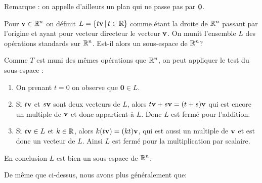 
Remarque : on appelle d'ailleurs  un plan qui ne passe pas par $\mathbf{0}$.


\begin{myprob}
Pour $\mathbf{v} \in \mathbb{R}^n$ on définit $L = \{ t\mathbf{v} \,|\, t\in \mathbb{R}\}$ comme
étant la droite de $\mathbb{R}^n$ passant par l'origine et ayant pour vecteur
directeur le vecteur $\mathbf{v}$. On munit l'ensemble $L$ des opérations standards sur $\mathbb{R}^n$. Est-il alors un sous-espace de $\mathbb{R}^n$?

\begin{mysol}
Comme $T$ est muni des mêmes opérations que $\mathbb{R}^n$, on peut appliquer le test du sous-espace :

\begin{enumerate}
\item
    On prenant $t=0$ on observe que $\mathbf 0 \in L$.
\item
  Si $t\mathbf{v}$ et $s\mathbf{v}$ sont deux vecteurs de $L$, alors
  $t\mathbf{v} + s\mathbf{v} = (t+s)\mathbf{v}$ qui est encore un multiple de
  $\mathbf{v}$ et donc appartient \`a $L$. Donc $L$ est fermé pour l'addition.
\item
  Si $t\mathbf{v} \in L$ et $k\in\mathbb{R}$, alors $k(t\mathbf{v}) = (kt)\mathbf{v}$, qui est aussi
  un multiple de $\mathbf{v}$ et est donc un vecteur de $L$. Ainsi $L$ est
  fermé pour la multiplication par scalaire.
\end{enumerate}

En conclusion $L$ est bien un sous-espace de $\mathbb{R}^n$.
\end{mysol}
\end{myprob}


De même que ci-dessus, nous avons plus généralement que:




